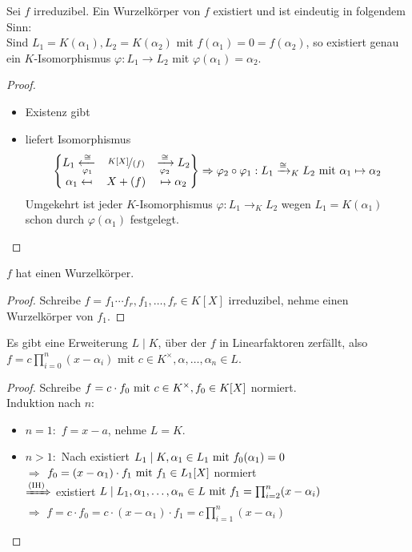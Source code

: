 \begin{proposition}
	Sei $f$ irreduzibel. Ein Wurzelkörper von $f$ existiert und ist eindeutig in folgendem Sinn:\\
	Sind $L_1 = K(\alpha_1), L_2 = K(\alpha_2)$ mit $f(\alpha_1) = 0 = f(\alpha_2)$, so existiert genau ein $K$-Isomorphismus $\varphi: L_1 \to L_2$ mit $\varphi(\alpha_1) = \alpha_2$.
\end{proposition}
\begin{proof}
	\begin{itemize}
		\item Existenz gibt 
		\item {} liefert Isomorphismus
		\begin{align*}
			\begin{Bmatrix} %
				L_1 \xleftarrow[\varphi_1]{\cong} & \lnkset{K[X]}{(f)} & \xrightarrow[\varphi_2]{\cong} L_2\\
				\alpha_1 \mapsfrom & X + (f) & \mapsto \alpha_2\\
			\end{Bmatrix}
			\Rightarrow \varphi_2 \circ \varphi_1 : L_1 \xrightarrow{\cong}_K L_2 \mit \alpha_1 \mapsto \alpha_2
		\end{align*}
		Umgekehrt ist jeder $K$-Isomorphismus $\varphi: L_1 \to_K L_2$ wegen $L_1 = K(\alpha_1)$ schon durch $\varphi(\alpha_1)$ festgelegt.
	\end{itemize}
\end{proof}
\begin{conclusion}
	$f$ hat einen Wurzelkörper.
\end{conclusion}
\begin{proof}
	Schreibe $f=f_1\cdots f_r, f_1,\dots,f_r \in K[X]$ irreduzibel, nehme einen Wurzelkörper von $f_1$.
\end{proof}
\begin{conclusion}
	Es gibt eine Erweiterung $L\mid K$, über der $f$ in Linearfaktoren zerfällt, also $f=c\prod_{i=0}^{n}(x-\alpha_i)$ mit $c \in K^{\times}, \alpha,\dots,\alpha_n \in L$. 
\end{conclusion}
\begin{proof}
	Schreibe $f=c\cdot f_0 \mit c \in K^{\times}, f_0 \in K[X]$ normiert.\\ Induktion nach $n$:
	\begin{itemize}
		\item $n=1:$ $f = x-a$, nehme $L=K$.
		\item $n>1:$ Nach  existiert $L_1 \mid K, \alpha_1 \in L_1 \mit f_0 (\alpha_1) = 0$\\
		$\Rightarrow$ $f_0 = (x-\alpha_1)\cdot f_1 \mit f_1 \in L_1 [X]$ normiert\\
		$\xRightarrow{\text{(IH)}}$ existiert $L\mid L_1 , \alpha_1, \dots, \alpha_n \in L \mit f_1 = \prod_{i=2}^n (x - \alpha_i)$\\
		$\Rightarrow$ $f = c\cdot f_0 = c\cdot (x-\alpha_1) \cdot f_1 = c \prod_{i=1}^n (x- \alpha_i)$
	\end{itemize}
\end{proof}
